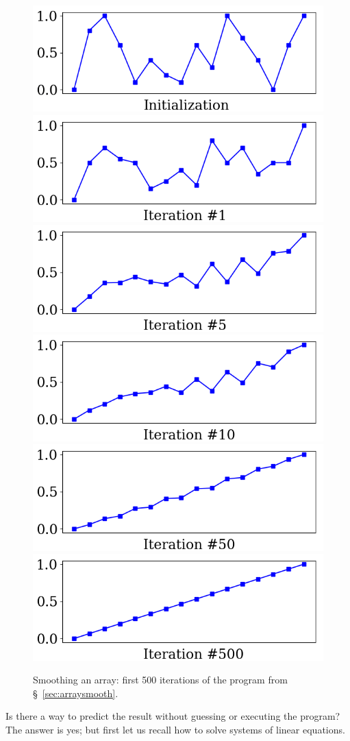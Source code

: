 \documentclass[notitlepage,oneside]{book}
\begin{document}
\begin{figure}[ht]
    \centering
    \includegraphics[width=.32\linewidth]{img/example_3.1_0.png}
    \includegraphics[width=.32\linewidth]{img/example_3.1_1.png}
    \includegraphics[width=.32\linewidth]{img/example_3.1_2.png}
    \includegraphics[width=.32\linewidth]{img/example_3.1_3.png}
    \includegraphics[width=.32\linewidth]{img/example_3.1_4.png}
    \includegraphics[width=.32\linewidth]{img/example_3.1_5.png}
\caption{Smoothing an array: first 500 iterations of the program from \S~\ref{sec:arraysmooth}.}
    \label{fig:linsys_smooth}
\end{figure}

Is there a way to predict the result without guessing or executing the program? The answer is yes; but first let us recall how to solve systems of linear equations.
\end{document}
